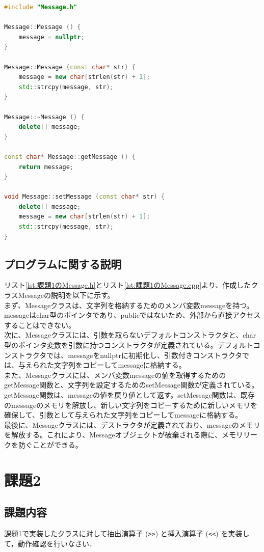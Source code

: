 \documentclass[paper=a4,fontsize=11pt]{jlreq}
\begin{document}
\begin{lstlisting}[caption={課題1のMessage.cpp}, language=C++, label={lst:課題1のMessage.cpp}]
#include "Message.h"

Message::Message () {
    message = nullptr;
}

Message::Message (const char* str) {
    message = new char[strlen(str) + 1];
    std::strcpy(message, str);
}

Message::~Message () {
    delete[] message;
}

const char* Message::getMessage () {
    return message;
}

void Message::setMessage (const char* str) {
    delete[] message;
    message = new char[strlen(str) + 1];
    std::strcpy(message, str);
}
\end{lstlisting}

\subsection{プログラムに関する説明}
リスト\ref{lst:課題1のMessage.h}とリスト\ref{lst:課題1のMessage.cpp}より、作成したクラスMessageの説明を以下に示す。\\
まず、Messageクラスは、文字列を格納するためのメンバ変数messageを持つ。messageはchar型のポインタであり、publicではないため、外部から直接アクセスすることはできない。\\
次に、Messageクラスには、引数を取らないデフォルトコンストラクタと、char型のポインタ変数を引数に持つコンストラクタが定義されている。デフォルトコンストラクタでは、messageをnullptrに初期化し、引数付きコンストラクタでは、与えられた文字列をコピーしてmessageに格納する。\\
また、Messageクラスには、メンバ変数messageの値を取得するためのgetMessage関数と、文字列を設定するためのsetMessage関数が定義されている。getMessage関数は、messageの値を戻り値として返す。setMessage関数は、既存のmessageのメモリを解放し、新しい文字列をコピーするために新しいメモリを確保して、引数として与えられた文字列をコピーしてmessageに格納する。\\
最後に、Messageクラスには、デストラクタが定義されており、messageのメモリを解放する。これにより、Messageオブジェクトが破棄される際に、メモリリークを防ぐことができる。



\section{課題2}
\subsection{課題内容}
課題1で実装したクラスに対して抽出演算子 (\texttt{>>}) と挿入演算子 (\texttt{<<}) を実装して，動作確認を行いなさい． %
\end{document}
